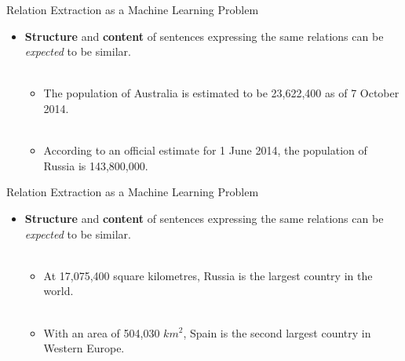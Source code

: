 \documentclass{beamer}
\begin{document}
\begin{frame}{Relation Extraction as a Machine Learning Problem}
 \begin{itemize}
  \item \textbf{Structure} and \textbf{content} of sentences expressing the same relations can be \emph{expected} to be similar.  \\~\\
 \begin{itemize}
      \item The population of Australia is estimated to be 23,622,400 as of 7 October 2014. \\~\\
      \item According to an official estimate for 1 June 2014, the population of Russia is 143,800,000.   
   \end{itemize}   
 \end{itemize}
\end{frame}
\begin{frame}{Relation Extraction as a Machine Learning Problem}
\begin{itemize}
\item \textbf{Structure} and \textbf{content} of sentences expressing the same relations can be \emph{expected} to be similar.  \\~\\
 \begin{itemize}   
    \item At 17,075,400 square kilometres, Russia is the largest country in the world. \\~\\
    \item With an area of 504,030 $km^{2}$, Spain is the second largest country in Western Europe. 
    \end{itemize}
 \end{itemize}
\end{frame}
\end{document}
